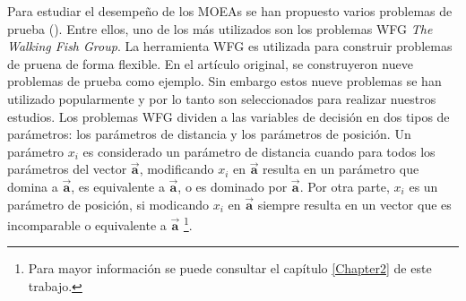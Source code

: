 Para estudiar el desempeño de los MOEAs se han propuesto varios problemas de prueba (\cite{Joel:WFG_REVIEW}).
%
Entre ellos, uno de los más utilizados son los problemas WFG \textit{The Walking Fish Group}.
%
La herramienta WFG es utilizada para construir problemas de pruena de forma flexible.
%
En el artículo original, se construyeron nueve problemas de prueba como ejemplo.
%
Sin embargo estos nueve problemas se han utilizado popularmente y por lo tanto son seleccionados para realizar nuestros estudios.
%
Los problemas WFG dividen a las variables de decisión en dos tipos de parámetros: los parámetros de distancia y los parámetros de posición.
%
Un parámetro $x_i$ es considerado un parámetro de distancia cuando para todos los parámetros del vector $\boldsymbol{\vec{a}}$, modificando $x_i$ en $\boldsymbol{\vec{a}}$ resulta en un parámetro que domina a $\boldsymbol{\vec{a}}$, es equivalente a $\boldsymbol{\vec{a}}$, o es dominado por $\boldsymbol{\vec{a}}$.
%
Por otra parte, $x_i$ es un parámetro de posición, si modicando $x_i$ en $\boldsymbol{\vec{a}}$ siempre resulta en un vector que es incomparable o equivalente a $\boldsymbol{\vec{a}}$ \footnote{Para mayor información se puede consultar el capítulo \ref{Chapter2} de este trabajo.}.


